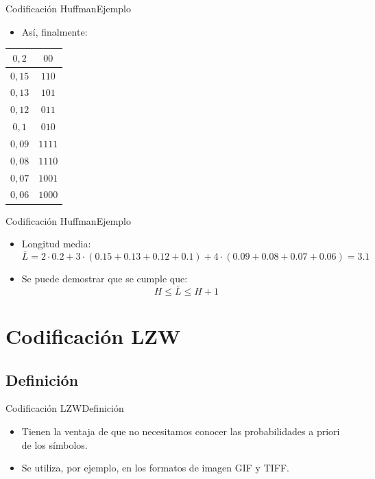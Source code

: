 \documentclass[10pt,compress]{beamer} %
\begin{document}
\begin{frame}{Codificación Huffman}{Ejemplo}
  \begin{itemize}
    \item Así, finalmente:
  \end{itemize}

  \begin{tabular}{|c|c|}
    \hline
    $0,2$ & $00$ \\
    \hline
    $0,15$ & $110$ \\
    \hline
    $0,13$ & $101$ \\
    \hline
    $0,12$ & $011$ \\
    \hline
    $0,1$ & $010$ \\
    \hline
    $0,09$ & $1111$ \\
    \hline
    $0,08$ & $1110$ \\
    \hline
    $0,07$ & $1001$ \\
    \hline
    $0,06$ & $1000$ \\
    \hline
  \end{tabular}
\end{frame}

\begin{frame}{Codificación Huffman}{Ejemplo}
  \begin{itemize}
    \item Longitud media:
    \begin{displaymath}
      \bar{L} = 2\cdot 0.2 + 3 \cdot (0.15 + 0.13 + 0.12 + 0.1) + 4 \cdot (0.09 + 0.08 + 0.07 + 0.06) = 3.1
    \end{displaymath}
    \item Se puede demostrar que se cumple que:
    \begin{displaymath}
      H \leq \bar{L} \leq H+1
    \end{displaymath}
  \end{itemize}

\end{frame}

\section{Codificación LZW}

\subsection{Definición}
\begin{frame}{Codificación LZW}{Definición}
	\begin{itemize}
    \item Tienen la ventaja de que no necesitamos conocer las probabilidades a priori de los símbolos.
    \item Se utiliza, por ejemplo, en los formatos de imagen GIF y TIFF.
	\end{itemize}
\end{frame}
\end{document}
